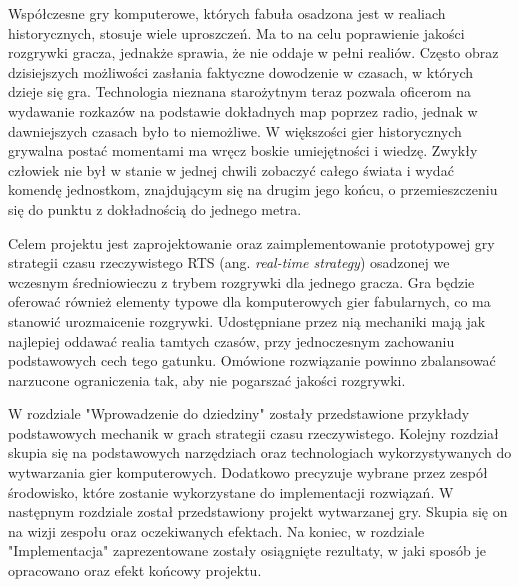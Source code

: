 Współczesne gry komputerowe, których fabuła osadzona jest w realiach historycznych, stosuje wiele uproszczeń. Ma to na celu poprawienie jakości
rozgrywki gracza, jednakże sprawia, że nie oddaje w pełni realiów. Często obraz dzisiejszych możliwości zasłania faktyczne dowodzenie
w czasach, w których dzieje się gra. Technologia nieznana starożytnym teraz pozwala oficerom na wydawanie rozkazów na podstawie dokładnych map poprzez radio,
jednak w dawniejszych czasach było to niemożliwe. W większości gier historycznych grywalna postać momentami ma wręcz boskie umiejętności i wiedzę. Zwykły człowiek nie był w
stanie w jednej chwili zobaczyć całego świata i wydać komendę jednostkom, znajdującym się na drugim jego końcu, o przemieszczeniu
się do punktu z dokładnością do jednego metra.

Celem projektu jest zaprojektowanie oraz zaimplementowanie prototypowej gry strategii czasu rzeczywistego RTS
(ang. \textit{real-time strategy}) osadzonej we wczesnym średniowieczu z trybem rozgrywki dla jednego gracza. Gra będzie
oferować również elementy typowe dla komputerowych gier fabularnych, co ma stanowić urozmaicenie rozgrywki. 
Udostępniane przez nią mechaniki mają jak najlepiej oddawać realia tamtych czasów, przy
jednoczesnym zachowaniu podstawowych cech tego gatunku. Omówione rozwiązanie powinno zbalansować narzucone ograniczenia tak, aby 
nie pogarszać jakości rozgrywki.

W rozdziale "Wprowadzenie do dziedziny" zostały przedstawione przykłady podstawowych mechanik w grach strategii czasu
rzeczywistego. Kolejny rozdział skupia się na podstawowych narzędziach oraz technologiach wykorzystywanych do wytwarzania
gier komputerowych. Dodatkowo precyzuje wybrane przez zespół środowisko, które zostanie wykorzystane do implementacji
rozwiązań. W następnym rozdziale został przedstawiony projekt wytwarzanej gry. Skupia się on na wizji zespołu oraz
oczekiwanych efektach. Na koniec, w rozdziale "Implementacja" zaprezentowane zostały osiągnięte rezultaty, w jaki
sposób je opracowano oraz efekt końcowy projektu.
